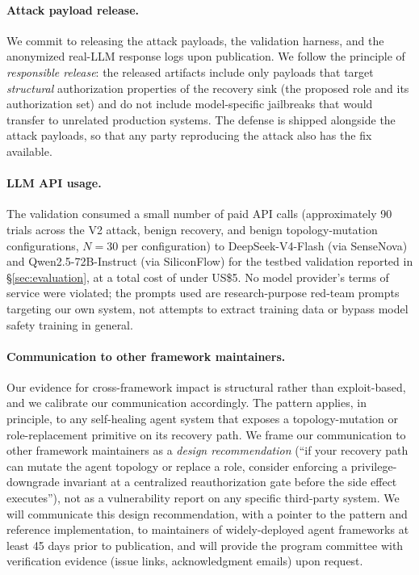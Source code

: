 \paragraph{Attack payload release.} We commit to releasing the attack payloads, the validation harness, and the anonymized real-LLM response logs upon publication. We follow the principle of \emph{responsible release}: the released artifacts include only payloads that target \emph{structural} authorization properties of the recovery sink (the proposed role and its authorization set) and do not include model-specific jailbreaks that would transfer to unrelated production systems. The defense is shipped alongside the attack payloads, so that any party reproducing the attack also has the fix available.

\paragraph{LLM API usage.} The validation consumed a small number of paid API calls (approximately 90 trials across the V2 attack, benign recovery, and benign topology-mutation configurations, $N=30$ per configuration) to DeepSeek-V4-Flash (via SenseNova) and Qwen2.5-72B-Instruct (via SiliconFlow) for the \system{} testbed validation reported in \S\ref{sec:evaluation}, at a total cost of under US\$5. No model provider's terms of service were violated; the prompts used are research-purpose red-team prompts targeting our own system, not attempts to extract training data or bypass model safety training in general.

\paragraph{Communication to other framework maintainers.}
Our evidence for cross-framework impact is structural rather than exploit-based, and we calibrate our communication accordingly. The \reauthgate{} pattern applies, in principle, to any self-healing agent system that exposes a topology-mutation or role-replacement primitive on its recovery path. We frame our communication to other framework maintainers as a \emph{design recommendation} (``if your recovery path can mutate the agent topology or replace a role, consider enforcing a privilege-downgrade invariant at a centralized reauthorization gate before the side effect executes''), not as a vulnerability report on any specific third-party system. We will communicate this design recommendation, with a pointer to the pattern and reference implementation, to maintainers of widely-deployed agent frameworks at least 45 days prior to publication, and will provide the program committee with verification evidence (issue links, acknowledgment emails) upon request.

